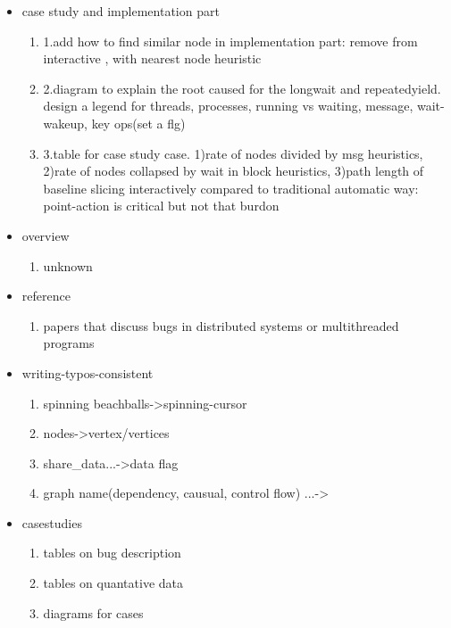 \begin{itemize}
\item case study and implementation part
	\begin{enumerate}
 	\item 1.add how to find similar node in implementation part: remove from interactive , with nearest node heuristic
 	\item 2.diagram to explain the root caused for the longwait and repeatedyield. design a legend for threads, processes, running vs waiting, message, wait-wakeup, key ops(set a flg)
	\item 3.table for case study case. 
		1)rate of nodes divided by msg heuristics,
		2)rate of nodes collapsed by wait in block heuristics,
		3)path length of baseline slicing interactively compared to traditional automatic way: point-action is critical but not that burdon
	\end{enumerate}
\item overview
	\begin{enumerate}
	\item unknown
	\end{enumerate}
\item reference
	\begin{enumerate}
	\item papers that discuss bugs in distributed systems or multithreaded programs
	\end{enumerate}

\item writing-typos-consistent
	\begin{enumerate}
	\item spinning beachballs->spinning-cursor
	\item nodes->vertex/vertices
	\item share\_data...->data flag
	\item graph name(dependency, causual, control flow) ...->
	\end{enumerate}

\item casestudies
	\begin{enumerate}
	\item tables on bug description
	\item tables on quantative data
	\item diagrams for cases
	\end{enumerate}

\end{itemize}

